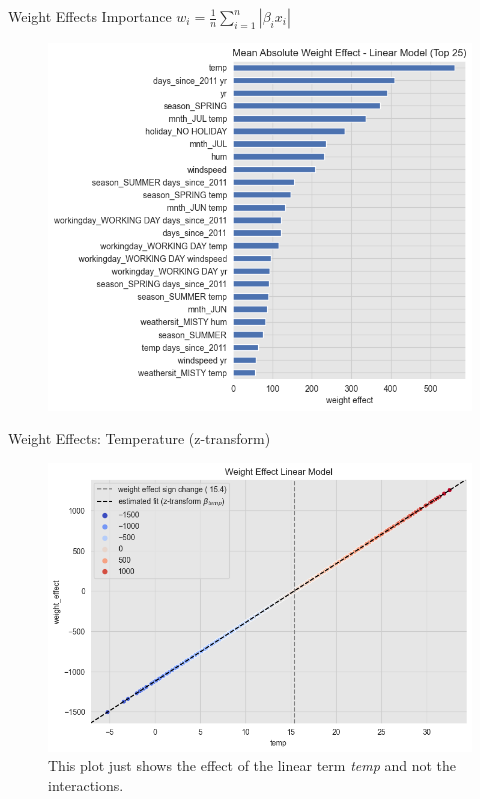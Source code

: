 \documentclass[10pt]{beamer}
\begin{document}
\begin{frame}{Weight Effects Importance $w_{i} = \frac{1}{n}\sum_{i=1}^{n}|\beta_{i}x_{i}|$}
\begin{center}
  \begin{figure}
    \includegraphics[scale=0.45]{images/interpretable_ml_62_0.png}
  \end{figure}
\end{center}
\end{frame}

\begin{frame}{Weight Effects: Temperature (z-transform)}
\begin{center}
  \begin{figure}
    \includegraphics[scale=0.48]{images/interpretable_ml_65_0.png}
    \caption{This plot just shows the effect of the linear term {\em temp} and not the interactions.}
  \end{figure}
\end{center}
\end{frame}
\end{document}

